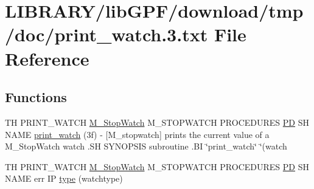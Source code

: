 \hypertarget{print__watch_83_8txt}{}\section{L\+I\+B\+R\+A\+R\+Y/lib\+G\+P\+F/download/tmp/doc/print\+\_\+watch.3.txt File Reference}
\label{print__watch_83_8txt}
\subsection*{Functions}
\begin{DoxyCompactItemize}
\item 
TH P\+R\+I\+N\+T\+\_\+\+W\+A\+T\+CH \hyperlink{option__stopwatch_83_8txt_aa2011fc45a5e502e87ee50996a8a9305}{M\+\_\+\+Stop\+Watch} M\+\_\+\+S\+T\+O\+P\+W\+A\+T\+CH P\+R\+O\+C\+E\+D\+U\+R\+ES \hyperlink{what__overview_81_8txt_a85f26da5a4481fbdb0d9c79f2b94de3e}{PD} SH N\+A\+ME \hyperlink{print__watch_83_8txt_a8615f1e2afa77ade01fc099f7805625e}{print\+\_\+watch} (3f) -\/ \mbox{[}\+M\+\_\+stopwatch\mbox{]} prints the current value of a M\+\_\+\+Stop\+Watch watch .\+S\+H S\+Y\+N\+O\+P\+S\+I\+S subroutine .\+B\+I \char`\"{}print\+\_\+watch\char`\"{} \char`\"{}(watch
\item 
TH P\+R\+I\+N\+T\+\_\+\+W\+A\+T\+CH \hyperlink{option__stopwatch_83_8txt_aa2011fc45a5e502e87ee50996a8a9305}{M\+\_\+\+Stop\+Watch} M\+\_\+\+S\+T\+O\+P\+W\+A\+T\+CH P\+R\+O\+C\+E\+D\+U\+R\+ES \hyperlink{what__overview_81_8txt_a85f26da5a4481fbdb0d9c79f2b94de3e}{PD} SH N\+A\+ME err IP \hyperlink{print__watch_83_8txt_abac438c111a8b03ed5b72e0e49efe1c0}{type} (watchtype)
\end{DoxyCompactItemize}
